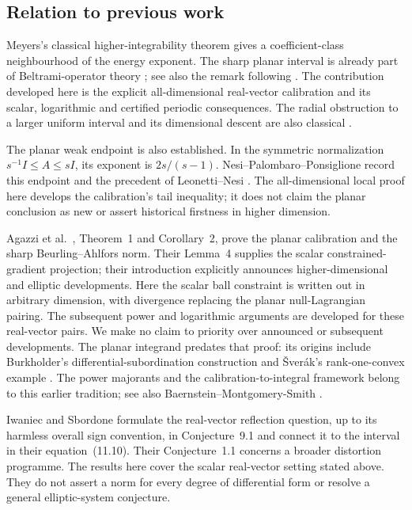 \documentclass[11pt,a4paper]{article}
\numberwithin{equation}{section}
\theoremstyle{definition}
\theoremstyle{remark}\newtheorem{remark}[theorem]{Remark}
\newcommand{\Id}{I}
\begin{document}
\subsection{Relation to previous work}

Meyers's classical higher-integrability theorem
\cite[Theorem~2]{Meyers1963} gives a coefficient-class neighbourhood of
the energy exponent. The sharp planar interval is already part of
Beltrami-operator theory \cite{AstalaIwaniecSaksman2001}; see also the
remark following \cite[equation~(11.10)]{IwaniecSbordone2001}.
The contribution developed here is the explicit all-dimensional
real-vector calibration and its scalar, logarithmic and certified
periodic consequences. The radial obstruction to a larger uniform
interval and its dimensional descent are also classical
\cite[Section~5]{Meyers1963}.

The planar weak endpoint is also established. In the symmetric
normalization \(s^{-1}\Id\leq A\leq s\Id\), its exponent is
\(2s/(s-1)\). Nesi--Palombaro--Ponsiglione
\cite[p.~617]{NesiPalombaroPonsiglione2014} record this endpoint
and the precedent of Leonetti--Nesi \cite{LeonettiNesi1997}.
The all-dimensional local proof here develops the calibration's tail
inequality; it does not claim the planar conclusion as new or
assert historical firstness in higher dimension.

Agazzi et al.\ \cite{Agazzi2026}, Theorem~1 and Corollary~2, prove the planar
calibration and the sharp Beurling--Ahlfors norm. Their Lemma~4 supplies the
scalar constrained-gradient projection; their introduction explicitly
announces higher-dimensional and elliptic developments. Here the scalar
ball constraint is written out in arbitrary dimension, with divergence
replacing the planar null-Lagrangian pairing. The subsequent power and
logarithmic arguments are developed for these real-vector pairs. We make
no claim to priority over announced or subsequent developments.
The planar integrand predates that proof: its origins include
Burkholder's differential-subordination construction and
{\v S}ver{\'a}k's rank-one-convex example
\cite{Burkholder1989,Sverak1990}. The power majorants and the
calibration-to-integral framework belong to this earlier tradition;
see also Baernstein--Montgomery-Smith \cite{Baernstein1997}.

Iwaniec and Sbordone \cite{IwaniecSbordone2001} formulate the real-vector
reflection question, up to its harmless overall sign convention, in
Conjecture~9.1 and connect it to the interval in
their equation~(11.10). Their Conjecture~1.1 concerns a broader distortion
programme. The results here cover the scalar real-vector setting stated
above. They do not assert a norm for every degree of differential form or
resolve a general elliptic-system conjecture.
\end{document}
